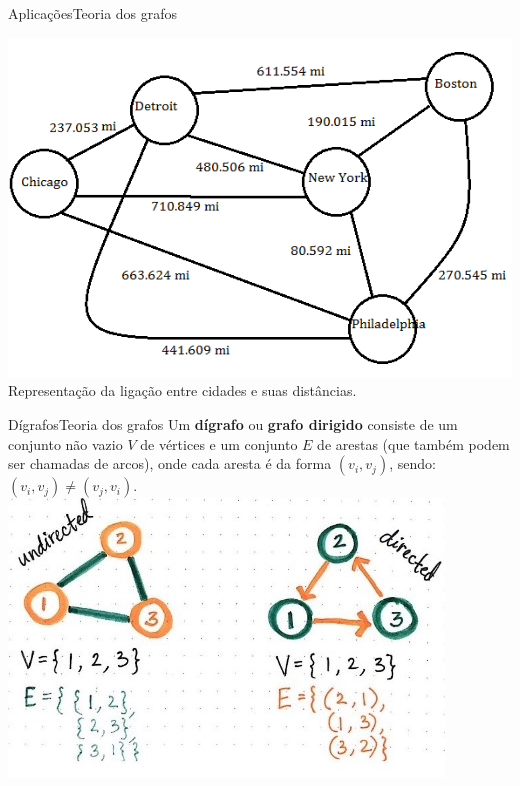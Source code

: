 \documentclass[t]{beamer}
\begin{document}

\begin{ftst}{Aplicações}{Teoria dos grafos}

\centering
\includegraphics[scale=0.5]{Figuras/city.png}\\
Representação da ligação entre cidades e suas distâncias.
\end{ftst}


\begin{ftst}{Dígrafos}{Teoria dos grafos}
\justifying
Um \textbf{dígrafo} ou \textbf{grafo dirigido} consiste de um conjunto não vazio $V$ de vértices e um conjunto $E$ de arestas (que também podem ser chamadas de arcos), onde cada aresta é da forma $(v_i,v_j)$, sendo: $(v_i,v_j) \neq (v_j,v_i)$.
\vone
\vone
\centering
\includegraphics[scale=0.6]{Figuras/digrafo.jpg}\\

\end{ftst}
\end{document}
